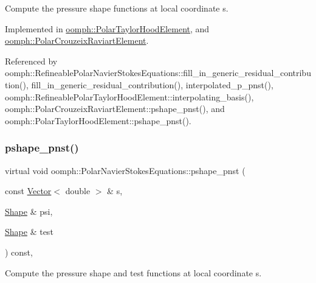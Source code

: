 Compute the pressure shape functions at local coordinate s. 



Implemented in \hyperlink{classoomph_1_1PolarTaylorHoodElement_a017ced81001a0b0cbeaf4701ef2d4792}{oomph\+::\+Polar\+Taylor\+Hood\+Element}, and \hyperlink{classoomph_1_1PolarCrouzeixRaviartElement_a1898936dd70065cb4054d1e1ba6a9d49}{oomph\+::\+Polar\+Crouzeix\+Raviart\+Element}.



Referenced by oomph\+::\+Refineable\+Polar\+Navier\+Stokes\+Equations\+::fill\+\_\+in\+\_\+generic\+\_\+residual\+\_\+contribution(), fill\+\_\+in\+\_\+generic\+\_\+residual\+\_\+contribution(), interpolated\+\_\+p\+\_\+pnst(), oomph\+::\+Refineable\+Polar\+Taylor\+Hood\+Element\+::interpolating\+\_\+basis(), oomph\+::\+Polar\+Crouzeix\+Raviart\+Element\+::pshape\+\_\+pnst(), and oomph\+::\+Polar\+Taylor\+Hood\+Element\+::pshape\+\_\+pnst().

\mbox{\label{classoomph_1_1PolarNavierStokesEquations_a2ec5597d86a5f93615d4a29f0a01ebf7}} 
\subsubsection{\texorpdfstring{pshape\+\_\+pnst()}{pshape\_pnst()}\hspace{0.1cm}{\footnotesize\ttfamily [2/2]}}
{\footnotesize\ttfamily virtual void oomph\+::\+Polar\+Navier\+Stokes\+Equations\+::pshape\+\_\+pnst (\begin{DoxyParamCaption}\item[{const \hyperlink{classoomph_1_1Vector}{Vector}$<$ double $>$ \&}]{s,  }\item[{\hyperlink{classoomph_1_1Shape}{Shape} \&}]{psi,  }\item[{\hyperlink{classoomph_1_1Shape}{Shape} \&}]{test }\end{DoxyParamCaption}) const\hspace{0.3cm}{\ttfamily [protected]}, {}}



Compute the pressure shape and test functions at local coordinate s. 



